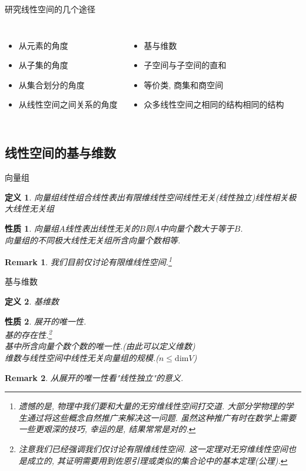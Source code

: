 \documentclass[11pt]{beamer}
\newtheorem{defi}{定义}[section]
\newtheorem{prop}{性质}[section]
\newtheorem{rmk}{Remark}[section]
\def\dim{\mathrm{dim}}
\begin{document}
\begin{frame}{研究线性空间的几个途径}
\begin{columns}
	\begin{itemize}
		\item 从元素的角度
		\item 从子集的角度
		\item 从集合划分的角度
		\item 从线性空间之间关系的角度
	\end{itemize}
	\begin{itemize}
		\item 基与维数
		\item 子空间与子空间的直和
		\item 等价类, 商集和商空间
		\item 众多线性空间之相同的结构相同的结构
	\end{itemize}
\end{columns}
\end{frame}

\subsection{线性空间的基与维数}
\frame{\subsectionpage}

\begin{frame}{向量组}
	\begin{defi}
		向量组\quad 线性组合\quad 线性表出\quad 有限维线性空间\quad 线性无关(线性独立)\quad 线性相关\quad 极大线性无关组
	\end{defi}
	\begin{prop}
		向量组$A$线性表出线性无关的$B$则$A$中向量个数大于等于$B$.\\
		向量组的不同极大线性无关组所含向量个数相等.
	\end{prop}
	\begin{rmk}
		我们目前仅讨论有限维线性空间.\footnote{遗憾的是, 物理中我们要和大量的无穷维线性空间打交道. 大部分学物理的学生通过将这些概念自然推广来解决这一问题. 虽然这种推广有时在数学上需要一些更艰深的技巧, 幸运的是, 结果常常是对的.}
	\end{rmk}
\end{frame}

\begin{frame}{基与维数}
	\begin{defi}
		基\quad 维数
	\end{defi}
	\begin{prop}
		展开的唯一性.\\
		基的存在性.\footnote{注意我们已经强调我们仅讨论有限维线性空间. 这一定理对无穷维线性空间也是成立的, 其证明需要用到佐恩引理或类似的集合论中的基本定理(公理).}\\
		基中所含向量个数个数的唯一性.(由此可以定义维数)\\
		维数与线性空间中线性无关向量组的规模.($n\leq\dim V$)
	\end{prop}
	\begin{rmk}
		从展开的唯一性看"线性独立"的意义.
	\end{rmk}
\end{frame}
\end{document}
